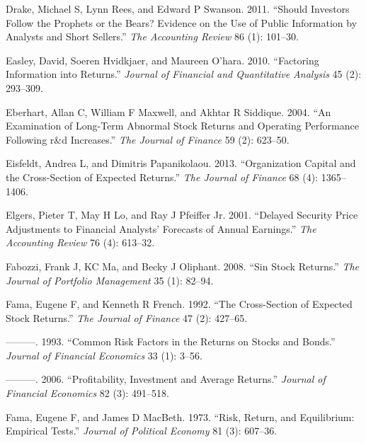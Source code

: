 \documentclass[
  letterpaper,
  DIV=11,
  numbers=noendperiod]{scrreprt}
\newlength{\cslhangindent}
\newlength{\cslentryspacingunit} %
\newenvironment{CSLReferences}[2] %
 {%
  \setlength{\parindent}{0pt}
  \ifodd #1
  \let\oldpar\par
  \def\par{\hangindent=\cslhangindent\oldpar}
  \fi
  \setlength{\parskip}{#2\cslentryspacingunit}
 }%
 {}
\begin{document}
\begin{CSLReferences}{1}{0}
\leavevmode{}%
Drake, Michael S, Lynn Rees, and Edward P Swanson. 2011. {``Should
Investors Follow the Prophets or the Bears? Evidence on the Use of
Public Information by Analysts and Short Sellers.''} \emph{The
Accounting Review} 86 (1): 101--30.

\leavevmode{}%
Easley, David, Soeren Hvidkjaer, and Maureen O'hara. 2010. {``Factoring
Information into Returns.''} \emph{Journal of Financial and Quantitative
Analysis} 45 (2): 293--309.

\leavevmode{}%
Eberhart, Allan C, William F Maxwell, and Akhtar R Siddique. 2004. {``An
Examination of Long-Term Abnormal Stock Returns and Operating
Performance Following r\&d Increases.''} \emph{The Journal of Finance}
59 (2): 623--50.

\leavevmode{}%
Eisfeldt, Andrea L, and Dimitris Papanikolaou. 2013. {``Organization
Capital and the Cross-Section of Expected Returns.''} \emph{The Journal
of Finance} 68 (4): 1365--1406.

\leavevmode{}%
Elgers, Pieter T, May H Lo, and Ray J Pfeiffer Jr. 2001. {``Delayed
Security Price Adjustments to Financial Analysts' Forecasts of Annual
Earnings.''} \emph{The Accounting Review} 76 (4): 613--32.

\leavevmode{}%
Fabozzi, Frank J, KC Ma, and Becky J Oliphant. 2008. {``Sin Stock
Returns.''} \emph{The Journal of Portfolio Management} 35 (1): 82--94.

\leavevmode{}%
Fama, Eugene F, and Kenneth R French. 1992. {``The Cross-Section of
Expected Stock Returns.''} \emph{The Journal of Finance} 47 (2):
427--65.

\leavevmode{}%
---------. 1993. {``Common Risk Factors in the Returns on Stocks and
Bonds.''} \emph{Journal of Financial Economics} 33 (1): 3--56.

\leavevmode{}%
---------. 2006. {``Profitability, Investment and Average Returns.''}
\emph{Journal of Financial Economics} 82 (3): 491--518.

\leavevmode{}%
Fama, Eugene F, and James D MacBeth. 1973. {``Risk, Return, and
Equilibrium: Empirical Tests.''} \emph{Journal of Political Economy} 81
(3): 607--36.


\end{CSLReferences}
\end{document}
